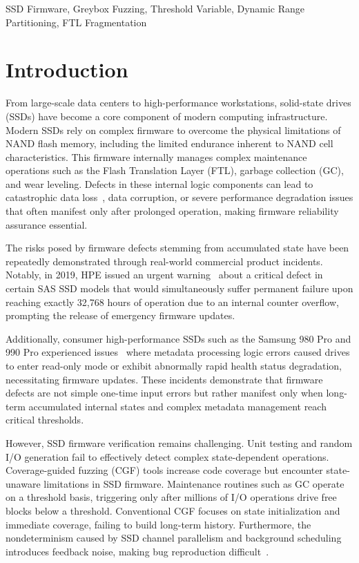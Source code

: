 \documentclass[conference]{IEEEtran}
\begin{document}
\begin{IEEEkeywords}
SSD Firmware, Greybox Fuzzing, Threshold Variable, Dynamic Range Partitioning, FTL Fragmentation
\end{IEEEkeywords}

\section{Introduction}
From large-scale data centers to high-performance workstations, solid-state drives (SSDs) have become a core component of modern computing infrastructure.
Modern SSDs rely on complex firmware to overcome the physical limitations of NAND flash memory, including the limited endurance inherent to NAND cell characteristics.
This firmware internally manages complex maintenance operations such as the Flash Translation Layer (FTL), garbage collection (GC), and wear leveling.
Defects in these internal logic components can lead to catastrophic data loss~\cite{narayanan2016ssd, han2021indepth}, data corruption, or severe performance degradation issues that often manifest only after prolonged operation, making firmware reliability assurance essential.

The risks posed by firmware defects stemming from accumulated state have been repeatedly demonstrated through real-world commercial product incidents.
Notably, in 2019, HPE issued an urgent warning~\cite{hpe-ssd-bulletin} about a critical defect in certain SAS SSD models that would simultaneously suffer permanent failure upon reaching exactly 32,768 hours of operation due to an internal counter overflow, prompting the release of emergency firmware updates.

Additionally, consumer high-performance SSDs such as the Samsung 980 Pro and 990 Pro experienced issues~\cite{tomshw-samsung-ssd} where metadata processing logic errors caused drives to enter read-only mode or exhibit abnormally rapid health status degradation, necessitating firmware updates.
These incidents demonstrate that firmware defects are not simple one-time input errors but rather manifest only when long-term accumulated internal states and complex metadata management reach critical thresholds.

However, SSD firmware verification remains challenging.
Unit testing and random I/O generation fail to effectively detect complex state-dependent operations.
Coverage-guided fuzzing (CGF) tools increase code coverage but encounter state-unaware limitations in SSD firmware.
Maintenance routines such as GC operate on a threshold basis, triggering only after millions of I/O operations drive free blocks below a threshold.
Conventional CGF focuses on state initialization and immediate coverage, failing to build long-term history.
Furthermore, the nondeterminism caused by SSD channel parallelism and background scheduling introduces feedback noise, making bug reproduction difficult~\cite{chen2016internal, zhang2023excessive}.
\end{document}
